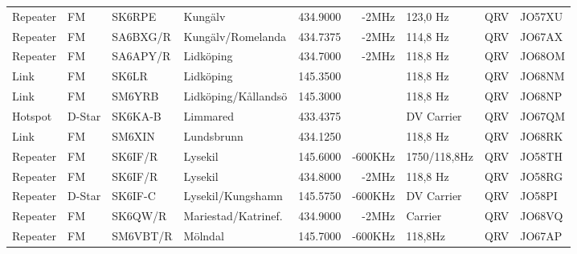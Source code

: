\begin{landscape}
\begin{longtable}{llllrrlcl}
	Repeater                  & FM            & SK6RPE        & Kungälv             & 434.9000          & -2MHz          & 123,0 Hz         & QRV             & JO57XU           \\
	Repeater                  & FM            & SA6BXG/R      & Kungälv/Romelanda   & 434.7375          & -2MHz          & 114,8 Hz         & QRV             & JO67AX           \\
	Repeater                  & FM            & SA6APY/R      & Lidköping           & 434.7000          & -2MHz          & 118,8 Hz         & QRV             & JO68OM           \\
	Link                      & FM            & SK6LR         & Lidköping           & 145.3500          &                & 118,8 Hz         & QRV             & JO68NM           \\
	Link                      & FM            & SM6YRB        & Lidköping/Kållandsö & 145.3000          &                & 118,8 Hz         & QRV             & JO68NP           \\
	Hotspot                   & D-Star        & SK6KA-B       & Limmared            & 433.4375          &                & DV Carrier       & QRV             & JO67QM           \\
	Link                      & FM            & SM6XIN        & Lundsbrunn          & 434.1250          &                & 118,8 Hz         & QRV             & JO68RK           \\
	Repeater                  & FM            & SK6IF/R       & Lysekil             & 145.6000          & -600KHz        & 1750/118,8Hz     & QRV             & JO58TH           \\
	Repeater                  & FM            & SK6IF/R       & Lysekil             & 434.8000          & -2MHz          & 118,8 Hz         & QRV             & JO58RG           \\
	Repeater                  & D-Star        & SK6IF-C       & Lysekil/Kungshamn   & 145.5750          & -600KHz        & DV Carrier       & QRV             & JO58PI           \\
	Repeater                  & FM            & SK6QW/R       & Mariestad/Katrinef. & 434.9000          & -2MHz          & Carrier          & QRV             & JO68VQ           \\
	Repeater                  & FM            & SM6VBT/R      & Mölndal             & 145.7000          & -600KHz        & 118,8Hz          & QRV             & JO67AP           \\

\end{longtable}
\end{landscape}
